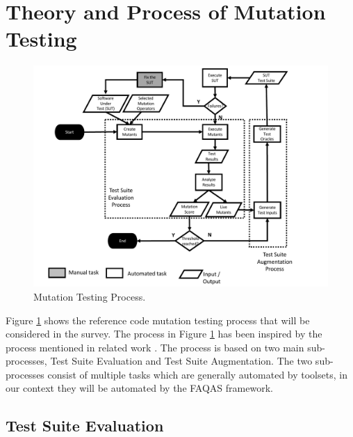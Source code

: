 
\section{Theory and Process of Mutation Testing}
\label{sec:process}

	\begin{figure}
	\centering
		\includegraphics[width=\textwidth]{images/process}
		\caption{Mutation Testing Process.}
		\label{fig:process}
	\end{figure}

Figure \ref{fig:process} shows the reference code mutation testing process that will be considered in the survey. The process in Figure \ref{fig:process} has been inspired by the process mentioned in related work \cite{offutt2001mutation,papadakis2019mutation}. The process is based on two main sub-processes, Test Suite Evaluation and Test Suite Augmentation. The two sub-processes consist of multiple tasks which are generally automated by toolsets, in our context they will be automated by the FAQAS framework. 

\subsection{Test Suite Evaluation} %
\label{sub:test_suite_evaluation}

